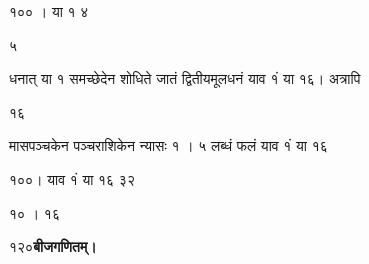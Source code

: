 \documentclass[11pt, openany]{book}
\begin{document}
\begin{sloppypar}
\hspace{1in}१०० । या १ ४

\hspace{1.25in}५

\hangindent=0.2in धनात् या १ समच्छेदेन शोधिते जातं द्वितीयमूलधनं याव १ं या १६। अत्रापि

\hspace{3.5in}१६

\hangindent=0.2in मासपञ्चकेन पञ्चराशिकेन न्यासः १ । ५ \hspace{0.75in}\textbar लब्धं फलं याव १ं या १६

\hspace{1.9in}१००। याव १ं या १६ \hspace{0.75in}३२

\hspace{1.9in}१० । १६
\end{sloppypar}
\thispagestyle{empty}
\newpage

\onehalfspacing
 १२०\hspace{2in}\textbf{बीजगणितम्।} 

\vspace{5mm}
\end{document}

